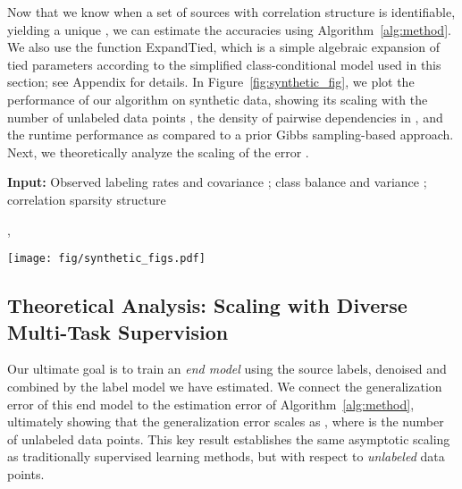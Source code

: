 \documentclass[letterpaper]{article}
\begin{document}
Now that we know when a set of sources with correlation structure 
is identifiable, yielding a unique , we can estimate the accuracies  using Algorithm~\ref{alg:method}.
We also use the function ExpandTied, which is a simple algebraic expansion of tied parameters according to the simplified class-conditional model used in this section; see Appendix\versionswitch{}{ \ref{appendix:rank-one-reduction}} for details.
In Figure~\ref{fig:synthetic_fig}, we
plot the performance of our algorithm on synthetic data, showing its
scaling with the number of unlabeled data points , the density of pairwise dependencies in , and the runtime performance as compared to a prior Gibbs sampling-based approach. Next, we theoretically analyze
the scaling of the error .

\begin{algorithm}[tb]
	\caption{Source Accuracy Estimation for Multi-Task Weak Supervision}
   	\label{alg:method}
	\begin{algorithmic}
\State \textbf{Input:}
			Observed labeling rates  and covariance ;
			class balance  and variance ;
			correlation sparsity structure 

		\State 

\State , 
		\State 
			\\
		\Return 
	\end{algorithmic}
\end{algorithm}

\begin{figure*}
    \centering
    \texttt{[image: fig/synthetic\_figs.pdf]}
    \caption{(Left) Estimation error  decreases with increasing . (Middle) Given , our model successfully recovers the source accuracies even with many pairwise dependencies among sources, where a naive conditionally-independent model fails. (Right) The runtime of \systemx~is independent of  after an initial matrix multiply, and can thus be multiple orders of magnitude faster than Gibbs sampling-based approaches~\cite{ratner2016data}.}
    \label{fig:synthetic_fig}
\end{figure*}

\subsection{Theoretical Analysis: Scaling with Diverse Multi-Task Supervision}
Our ultimate goal is to train an \textit{end model} using the source labels, denoised and combined by the label model  we have estimated.
We connect the generalization error of this end model to the estimation error of Algorithm~\ref{alg:method}, ultimately showing that the generalization error scales as , where  is the number of unlabeled data points.
This key result establishes the same asymptotic scaling as traditionally supervised learning methods, but with respect to \textit{unlabeled} data points.
\end{document}
